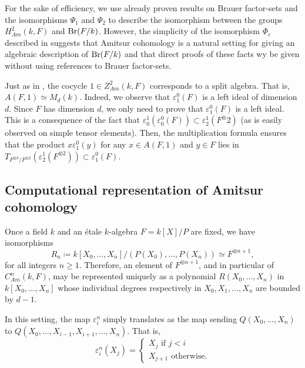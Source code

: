     \begin{remark}
        For the sake of efficiency, we use already proven results on Brauer factor-sets and the isomorphisms \(\Psi_1\) and \(\Psi_2\) to describe the isomorphism between the groups \(H^2_{Am}(k,F)\) and \(\operatorname{Br}(F/k)\). However, the simplicity of the isomorphism \(\Phi_c\) described in  suggests that Amitsur cohomology is a natural setting for giving an algebraic description of \(\operatorname{Br}(F/k)\) and that direct proofs of these facts wy be given without using references to Brauer factor-sets.
    \end{remark}

    \begin{example}\label{ex:AmiTrivialCocycle}
        Just as in , the cocycle \(1 \in Z_{Am}^2(k,F)\) corresponds to a split algebra. That is, \(A(F,1) \simeq M_d(k)\). Indeed, we observe that \(\varepsilon_1^0(F)\) is a left ideal of dimension \(d\). Since \(F\) has dimension \(d\), we only need to prove that \(\varepsilon_1^0(F)\) is a left ideal. This is a consequence of the fact that \(\varepsilon_0^1(\varepsilon_0^0(F)) \subset \varepsilon_2^1(F^\otimes 2)\) (as is easily observed on simple tensor elements). Then, the multiplication formula ensures that the product \(x\varepsilon_1^0(y)\) for any \(x \in A(F,1)\) and \(y \in F\) lies in \(T_{F^{\otimes 3}/F^{\otimes 2}}(\varepsilon_2^1(F^{\otimes 2})) \subset \varepsilon_1^0(F)\).
    \end{example}

\subsection{Computational representation of Amitsur cohomology}\label{Sec:CompRepAmi}
    Once a field \(k\) and an étale \(k\)-algebra \(F = k[X]/P\) are fixed, we have isomorphisms \[R_n \coloneqq k[X_0,\hdots,X_n]/(P(X_0),\hdots,P(X_n)) \simeq F^{\otimes n+1},\] for all integers \(n \geq 1\). Therefore, an element of \(F^{\otimes n+1}\), and in particular of \(C_{Am}^n(k,F)\), may be represented uniquely as a polynomial \(R(X_0,\hdots,X_n)\) in \(k[X_0,\hdots,X_n]\) whose individual degrees respectively in \(X_0,X_1,\hdots,X_n\) are bounded by \(d-1\). 

    In this setting, the map \(\varepsilon_i^n\) simply translates as the map sending \(Q(X_0,\hdots,X_n)\) to \(Q(X_0,\hdots,X_{i-1},X_{i+1},\hdots,X_n)\). That is, 
    \[\varepsilon_i^n(X_j) = \begin{cases}
        X_j \text{ if } j < i \\
        X_{j+1} \text{ otherwise.}
    \end{cases}
    \]

